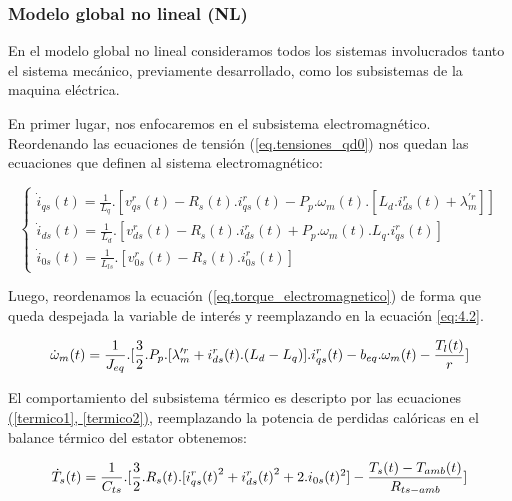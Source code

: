 \documentclass{article}
\begin{document}

\subsubsection{Modelo global no lineal (NL)}

En el modelo global no lineal consideramos todos los sistemas involucrados 
tanto el sistema mecánico, previamente desarrollado, como los subsistemas de la maquina eléctrica.

En primer lugar, nos enfocaremos en el subsistema electromagnético. Reordenando las ecuaciones de tensión (\ref{eq.tensiones_qd0})
nos quedan las ecuaciones que definen al sistema electromagnético:

\begin{equation}\label{eq:mi_ecuacion}
    \begin{cases}
        \dot{i}_{qs}(t) = \frac{1}{L_{q}}.[v_{qs}^r(t) - R_{s}(t).i_{qs}^r(t) - P_{p}.\omega_{m}(t).[L_{d}.i_{ds}^r(t) + \lambda_{m}^{\prime r}]]  \\
        \dot{i}_{ds}(t) = \frac{1}{L_{d}}.[v_{ds}^r(t) - R_{s}(t).i_{ds}^r(t) + P_{p}.\omega_{m}(t).L_{q}.i_{qs}^r(t)]  \\
        \dot{i}_{0s}(t) = \frac{1}{L_{ls}}.[v_{0s}^r(t) - R_{s}(t).i_{0s}^r(t)]
    \end{cases}
\end{equation}

Luego, reordenamos la ecuación (\ref{eq.torque_electromagnetico}) de forma que queda despejada la variable de interés y reemplazando en la ecuación \ref{eq:4.2}.

\begin{equation}\label{eq.torque_electromagnetico_reordenado}
    \dot{\omega}_{m}(t) = \frac{1}{J_{eq}}.[\frac{3}{2}.P_{p}.[\lambda_{m}^{\prime r}+i_{ds}^r(t).(L_{d}-L_{q})].i_{qs}^r(t) - b_{eq}.\omega_{m}(t) - \frac{T_{l}(t)}{r}]\\
\end{equation}

El comportamiento del subsistema térmico es descripto por las ecuaciones
\hyperref[termico1, termico2]{(\ref*{termico1}, \ref*{termico2})}, reemplazando la potencia de perdidas calóricas en el balance térmico del estator
obtenemos:

\begin{equation}\label{termico3}
    \dot{T}_{s}(t) = \frac{1}{C_{ts}}.[\frac{3}{2}.R_{s}(t).[{i_{qs}^r(t)}^2+{i_{ds}^r(t)}^2 + 2.i_{0s}(t)^2] - \frac{T_{s}(t)-T_{amb}(t)}{R_{ts-amb}}]\\
\end{equation}
\end{document}
